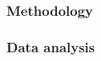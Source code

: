 \documentclass[../main.tex]{subfiles}
\begin{document}
    
\subsubsection*{Methodology}
\subsubsection*{Data analysis}
\end{document}
